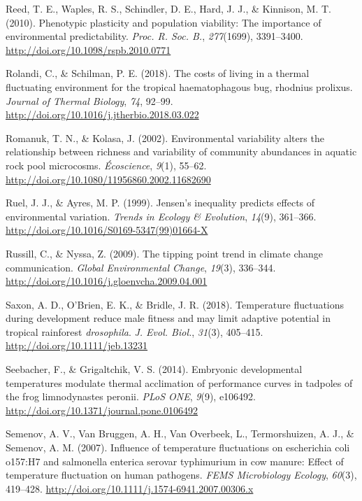 \documentclass[12pt,twoside]{reedthesis}
\begin{document}
\leavevmode\hypertarget{ref-reed_phenotypic_2010}{}%
Reed, T. E., Waples, R. S., Schindler, D. E., Hard, J. J., \& Kinnison, M. T. (2010). Phenotypic plasticity and population viability: The importance of environmental predictability. \emph{Proc. R. Soc. B.}, \emph{277}(1699), 3391--3400. \url{http://doi.org/10.1098/rspb.2010.0771}

\leavevmode\hypertarget{ref-rolandi_costs_2018}{}%
Rolandi, C., \& Schilman, P. E. (2018). The costs of living in a thermal fluctuating environment for the tropical haematophagous bug, rhodnius prolixus. \emph{Journal of Thermal Biology}, \emph{74}, 92--99. \url{http://doi.org/10.1016/j.jtherbio.2018.03.022}

\leavevmode\hypertarget{ref-romanuk_environmental_2002}{}%
Romanuk, T. N., \& Kolasa, J. (2002). Environmental variability alters the relationship between richness and variability of community abundances in aquatic rock pool microcosms. \emph{Écoscience}, \emph{9}(1), 55--62. \url{http://doi.org/10.1080/11956860.2002.11682690}

\leavevmode\hypertarget{ref-ruel_jensens_1999}{}%
Ruel, J. J., \& Ayres, M. P. (1999). Jensen's inequality predicts effects of environmental variation. \emph{Trends in Ecology \& Evolution}, \emph{14}(9), 361--366. \url{http://doi.org/10.1016/S0169-5347(99)01664-X}

\leavevmode\hypertarget{ref-russill_tipping_2009}{}%
Russill, C., \& Nyssa, Z. (2009). The tipping point trend in climate change communication. \emph{Global Environmental Change}, \emph{19}(3), 336--344. \url{http://doi.org/10.1016/j.gloenvcha.2009.04.001}

\leavevmode\hypertarget{ref-saxon_temperature_2018-1}{}%
Saxon, A. D., O'Brien, E. K., \& Bridle, J. R. (2018). Temperature fluctuations during development reduce male fitness and may limit adaptive potential in tropical rainforest \emph{drosophila}. \emph{J. Evol. Biol.}, \emph{31}(3), 405--415. \url{http://doi.org/10.1111/jeb.13231}

\leavevmode\hypertarget{ref-seebacher_embryonic_2014}{}%
Seebacher, F., \& Grigaltchik, V. S. (2014). Embryonic developmental temperatures modulate thermal acclimation of performance curves in tadpoles of the frog limnodynastes peronii. \emph{PLoS ONE}, \emph{9}(9), e106492. \url{http://doi.org/10.1371/journal.pone.0106492}

\leavevmode\hypertarget{ref-semenov_influence_2007}{}%
Semenov, A. V., Van Bruggen, A. H., Van Overbeek, L., Termorshuizen, A. J., \& Semenov, A. M. (2007). Influence of temperature fluctuations on escherichia coli o157:H7 and salmonella enterica serovar typhimurium in cow manure: Effect of temperature fluctuation on human pathogens. \emph{FEMS Microbiology Ecology}, \emph{60}(3), 419--428. \url{http://doi.org/10.1111/j.1574-6941.2007.00306.x}
\end{document}
